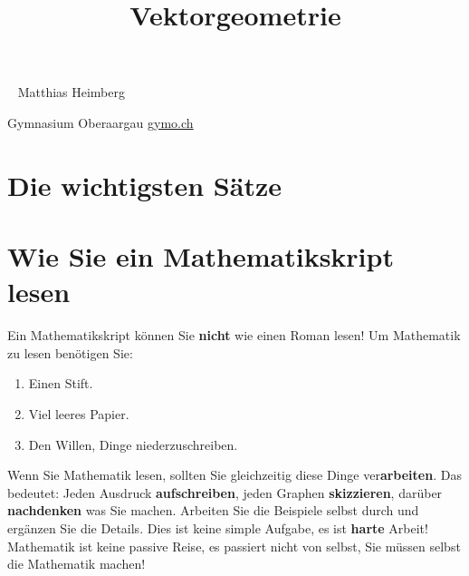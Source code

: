 \documentclass[justified,openany,nofonts]{tufte-book}
\title{Vektorgeometrie}
\begin{document}
\maketitle



\begin{fullwidth}
~\vfill
\thispagestyle{empty}
\setlength{\parindent}{0pt}
\setlength{\parskip}{\baselineskip}
Matthias Heimberg

Gymnasium Oberaargau \url{gymo.ch}



\end{fullwidth}


\tableofcontents





\chapter*{Die wichtigsten Sätze}%



\chapter*{Wie Sie ein Mathematikskript lesen}

Ein Mathematikskript können Sie \textbf{nicht} wie einen Roman lesen! Um Mathematik zu lesen benötigen Sie:
\begin{enumerate}
\item Einen Stift.
\item Viel leeres Papier.
\item Den Willen, Dinge niederzuschreiben.
\end{enumerate}
Wenn Sie Mathematik lesen, sollten Sie gleichzeitig diese Dinge ver\textbf{arbeiten}. Das bedeutet: Jeden Ausdruck \textbf{aufschreiben}, jeden Graphen \textbf{skizzieren}, darüber \textbf{nachdenken} was Sie machen. Arbeiten Sie die Beispiele selbst durch und ergänzen Sie die Details. Dies ist keine simple Aufgabe, es ist \textbf{harte} Arbeit! Mathematik ist keine passive Reise, es passiert nicht von selbst, Sie müssen selbst die Mathematik machen!



\setcounter{chapter}{0}






%
%

\printindex
\end{document}
